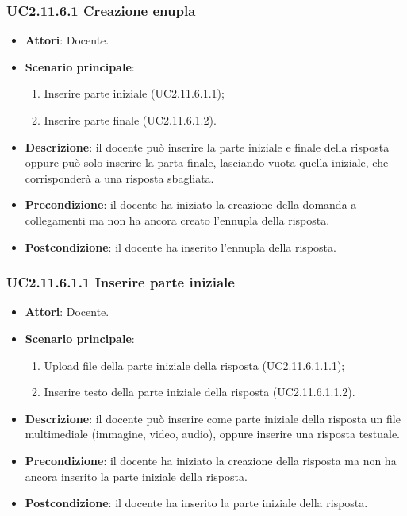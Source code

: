 \subsubsection{UC2.11.6.1 Creazione enupla}
\begin{itemize}
\item \textbf{Attori}: Docente.
\item \textbf{Scenario principale}:
\begin{enumerate}
\item Inserire parte iniziale (UC2.11.6.1.1);
\item Inserire parte finale (UC2.11.6.1.2).
\end{enumerate}
\item \textbf{Descrizione}: il docente può inserire la parte iniziale e finale della risposta oppure può solo inserire la parta finale, lasciando vuota quella iniziale, che corrisponderà a una risposta sbagliata.
\item \textbf{Precondizione}: il docente ha iniziato la creazione della domanda a collegamenti ma non ha ancora creato l'ennupla della risposta.
\item \textbf{Postcondizione}: il docente ha inserito l'ennupla della risposta.
\end{itemize}
\subsubsection{UC2.11.6.1.1 Inserire parte iniziale}
\begin{itemize}
\item \textbf{Attori}: Docente.
\item \textbf{Scenario principale}:
\begin{enumerate}
\item Upload file della parte iniziale della risposta (UC2.11.6.1.1.1);
\item Inserire testo della parte iniziale della risposta (UC2.11.6.1.1.2).
\end{enumerate}
\item \textbf{Descrizione}: il docente può inserire come parte iniziale della risposta un file multimediale (immagine, video, audio), oppure inserire una risposta testuale.
\item \textbf{Precondizione}: il docente ha iniziato la creazione della risposta ma non ha ancora inserito la parte iniziale della risposta.
\item \textbf{Postcondizione}: il docente ha inserito la parte iniziale della risposta.
\end{itemize}
